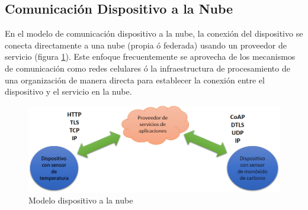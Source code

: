   
\subsection{Comunicación Dispositivo a la Nube}
En el modelo de comunicación dispositivo a la nube, la conexión del dispositivo se conecta directamente a una nube (propia ó federada) usando un proveedor de servicio (figura \ref{fig:d2n}). Este enfoque frecuentemente se aprovecha de los mecanismos de comunicación como redes celulares ó la infraestructura de procesamiento de una  organización de manera directa para establecer la conexión entre el dispositivo y el servicio en la nube.
\begin{figure}[htb]
\centering
\includegraphics[scale=0.425]{./Figuras/d2n.png}
\caption{Modelo dispositivo a la nube}
\label{fig:d2n}
\vspace*{-10pt}
\end{figure}

